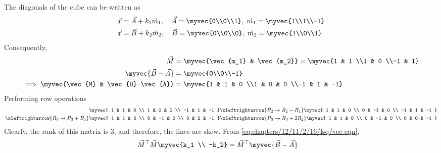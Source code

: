 The diagonals of the cube can be written as 
\begin{align}
\vec{x} &= \vec{A} + k_1\vec{m}_1, \quad \vec{A} = \myvec{0\\0\\1}, \; \vec{m}_1 = \myvec{1\\1\\-1} \\
\vec{x} &= \vec{B} + k_2\vec{m}_2, \quad \vec{B} = \myvec{0\\0\\0}, \; \vec{m}_2 = \myvec{1\\0\\1}
\end{align}
Consequently,
\begin{align}
	\vec{M} &= \myvec{\vec{m_1} & \vec{m_2}} = \myvec{1 & 1 \\1 & 0 \\-1 & 1}
	\\
	\myvec{\vec{B} - \vec{A}} &= \myvec{0\\0\\-1}
	\\
	\implies
	\myvec{\vec{M} & \vec{B}-\vec{A}} &= \myvec{1 & 1 & 0 \\1 & 0 & 0 \\-1 & 1 & -1}
\end{align}
Performing row operations
\begin{align*}
    \myvec{
        1 & 1 & 0 \\
        1 & 0 & 0 \\
       -1 & 1 & -1
    }
    \xleftrightarrow{R_2 \to R_2 - R_1}
    \myvec{
        1 & 1 & 0 \\
        0 & -1 & 0 \\
       -1 & 1 & -1
    }
    \\ 
   \xleftrightarrow{R_3 \to R_3 + R_1}
    \myvec{
        1 & 1 & 0 \\
        0 & -1 & 0 \\
        0 & 2 & -1
    }
    \xleftrightarrow{R_3 \to R_3 + 2R_2}
    \myvec{
        1 & 1 & 0 \\
        0 & -1 & 0 \\
        0 & 0 & -1
    }
\end{align*}
Clearly, the rank of this matrix is 3, and therefore, the lines are skew.
        From \eqref{eq:chapters/12/11/2/16/lsq/vec-eqn},  
\begin{align}
  \vec{M}^\top\vec{M}\myvec{k_1 \\ -k_2} &= \vec{M}^\top\myvec{\vec{B}-\vec{A}}
\end{align}
